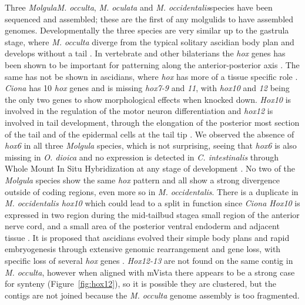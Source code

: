 Three \textit{Molgula}\textemdash\textit{M. occulta}, \textit{M. oculata} and \textit{M. occidentalis}\textemdash species have been sequenced and assembled; these are the first of any molgulids to have assembled genomes. Developmentally the three species are very similar up to the gastrula stage, where \textit{M. occulta} diverge from the typical solitary ascidian body plan and develops without a tail \cite{berrill_studies_1931,nishida_cell_1987}. In vertebrate and other bilaterians the \textit{hox} genes has been shown to be important for patterning along the anterior-posterior axis \cite{finnerty_origins_2003,mallo_regulation_2013}. The same has not be shown in ascidians, where \textit{hox} has more of a tissue specific role \cite{ikuta_limited_2010}.  \textit{Ciona} has 10 \textit{hox} genes and is missing \textit{hox7-9} and \textit{11}, with \textit{hox10} and \textit{12} being the only two genes to show morphological effects when knocked down. \textit{Hox10} is involved in the regulation of the motor neuron differentiation and \textit{hox12} is involved in tail development, through the elongation of the posterior most section of the tail and of the epidermal cells at the tail tip \cite{ikuta_limited_2010}. We observed the absence of \textit{hox6} in all three \textit{Molgula} species, which is not surprising, seeing that \textit{hox6} is also missing in \textit{O. dioica} and no expression is detected in \textit{C. intestinalis} through Whole Mount In Situ Hybridization at any stage of development \cite{ikuta_ciona_2004,seo_hox_2004}. No two of the \textit{Molgula} species show the same \textit{hox} pattern and all show a strong divergence outside of coding regions, even more so in \textit{M. occidentalis}. There is a duplicate in \textit{M. occidentalis hox10} which could lead to a split in function since \textit{Ciona Hox10}  is expressed in two region during the mid-tailbud stage\textemdash a small region of the anterior nerve cord, and a small area of the posterior ventral endoderm and adjacent tissue \cite{ikuta_ciona_2004}. It is proposed that ascidians evolved their simple body plans and rapid embryogenesis through extensive genomic rearrangement and gene loss, with specific loss of several \textit{hox} genes \cite{ikuta_organization_2005}. \textit{Hox12-13} are not found on the same contig in \textit{M. occulta}, however when aligned with mVista there appears to be a strong case for synteny (Figure~\ref{fig:hox12}), so it is possible they are clustered, but the contigs are not joined because the \textit{M. occulta} genome assembly is too fragmented.

